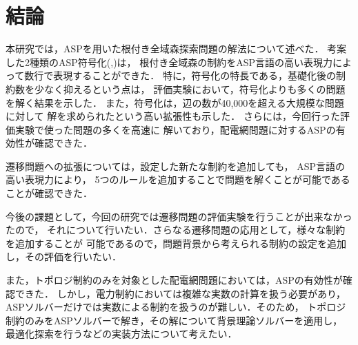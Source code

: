 \chapter{結論} \label{chap:conc}

本研究では，ASPを用いた根付き全域森探索問題の解法について述べた．
考案した2種類のASP符号化(,)は，
根付き全域森の制約をASP言語の高い表現力によって数行で表現することができた．
特に，符号化の特長である，基礎化後の制約数を少なく抑えるという点は，
評価実験において，符号化よりも多くの問題を解く結果を示した．
また，符号化は，辺の数が40,000を超える大規模な問題に対して
解を求められたという高い拡張性も示した．
さらには，今回行った評価実験で使った問題の多くを高速に
解いており，配電網問題に対するASPの有効性が確認できた．

遷移問題への拡張については，設定した新たな制約を追加しても，
ASP言語の高い表現力により，
5つのルールを追加することで問題を解くことが可能であることが確認できた．


今後の課題として，今回の研究では遷移問題の評価実験を行うことが出来なかったので，
それについて行いたい．さらなる遷移問題の応用として，様々な制約を追加することが
可能であるので，問題背景から考えられる制約の設定を追加し，その評価を行いたい．

また，トポロジ制約のみを対象とした配電網問題においては，ASPの有効性が確認できた．
しかし，電力制約においては複雑な実数の計算を扱う必要があり，
ASPソルバーだけでは実数による制約を扱うのが難しい．そのため，
トポロジ制約のみをASPソルバーで解き，その解について背景理論ソルバーを適用し，
最適化探索を行うなどの実装方法について考えたい．

